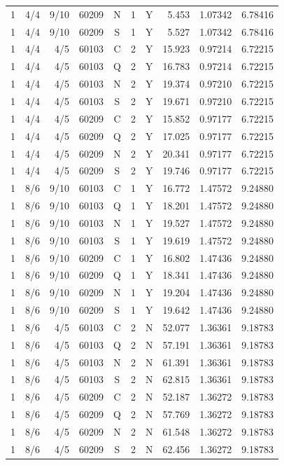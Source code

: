 \begin{longtable}{rlrrcccrrr}
1 & 4/4 & 9/10 & 60209 & N & 1 & Y & 5.453 & 1.07342 & 6.78416 \\
1 & 4/4 & 9/10 & 60209 & S & 1 & Y & 5.527 & 1.07342 & 6.78416 \\
1 & 4/4 & 4/5 & 60103 & C & 2 & Y & 15.923 & 0.97214 & 6.72215 \\
1 & 4/4 & 4/5 & 60103 & Q & 2 & Y & 16.783 & 0.97214 & 6.72215 \\
1 & 4/4 & 4/5 & 60103 & N & 2 & Y & 19.374 & 0.97210 & 6.72215 \\
1 & 4/4 & 4/5 & 60103 & S & 2 & Y & 19.671 & 0.97210 & 6.72215 \\
1 & 4/4 & 4/5 & 60209 & C & 2 & Y & 15.852 & 0.97177 & 6.72215 \\
1 & 4/4 & 4/5 & 60209 & Q & 2 & Y & 17.025 & 0.97177 & 6.72215 \\
1 & 4/4 & 4/5 & 60209 & N & 2 & Y & 20.341 & 0.97177 & 6.72215 \\
1 & 4/4 & 4/5 & 60209 & S & 2 & Y & 19.746 & 0.97177 & 6.72215 \\
1 & 8/6 & 9/10 & 60103 & C & 1 & Y & 16.772 & 1.47572 & 9.24880 \\
1 & 8/6 & 9/10 & 60103 & Q & 1 & Y & 18.201 & 1.47572 & 9.24880 \\
1 & 8/6 & 9/10 & 60103 & N & 1 & Y & 19.527 & 1.47572 & 9.24880 \\
1 & 8/6 & 9/10 & 60103 & S & 1 & Y & 19.619 & 1.47572 & 9.24880 \\
1 & 8/6 & 9/10 & 60209 & C & 1 & Y & 16.802 & 1.47436 & 9.24880 \\
1 & 8/6 & 9/10 & 60209 & Q & 1 & Y & 18.341 & 1.47436 & 9.24880 \\
1 & 8/6 & 9/10 & 60209 & N & 1 & Y & 19.204 & 1.47436 & 9.24880 \\
1 & 8/6 & 9/10 & 60209 & S & 1 & Y & 19.642 & 1.47436 & 9.24880 \\
1 & 8/6 & 4/5 & 60103 & C & 2 & N & 52.077 & 1.36361 & 9.18783 \\
1 & 8/6 & 4/5 & 60103 & Q & 2 & N & 57.191 & 1.36361 & 9.18783 \\
1 & 8/6 & 4/5 & 60103 & N & 2 & N & 61.391 & 1.36361 & 9.18783 \\
1 & 8/6 & 4/5 & 60103 & S & 2 & N & 62.815 & 1.36361 & 9.18783 \\
1 & 8/6 & 4/5 & 60209 & C & 2 & N & 52.187 & 1.36272 & 9.18783 \\
1 & 8/6 & 4/5 & 60209 & Q & 2 & N & 57.769 & 1.36272 & 9.18783 \\
1 & 8/6 & 4/5 & 60209 & N & 2 & N & 61.548 & 1.36272 & 9.18783 \\
1 & 8/6 & 4/5 & 60209 & S & 2 & N & 62.456 & 1.36272 & 9.18783 \\
\hline
\end{longtable}

